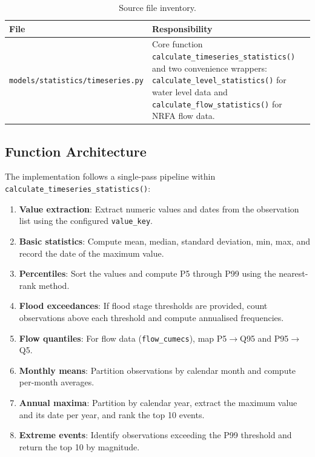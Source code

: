 \documentclass[11pt,a4paper]{article}
\begin{document}
\begin{table}[H]
\centering
\caption{Source file inventory.}
\label{tab:source_files}
\begin{tabular}{lp{10cm}}
\toprule
\textbf{File} & \textbf{Responsibility} \\
\midrule
\texttt{models/statistics/timeseries.py} & Core function \texttt{calculate\_timeseries\_statistics()} and two convenience wrappers: \texttt{calculate\_level\_statistics()} for water level data and \texttt{calculate\_flow\_statistics()} for NRFA flow data. \\
\bottomrule
\end{tabular}
\end{table}

\subsection{Function Architecture}

The implementation follows a single-pass pipeline within \texttt{calculate\_timeseries\_statistics()}:

\begin{enumerate}
    \item \textbf{Value extraction}: Extract numeric values and dates from the observation list using the configured \texttt{value\_key}.
    \item \textbf{Basic statistics}: Compute mean, median, standard deviation, min, max, and record the date of the maximum value.
    \item \textbf{Percentiles}: Sort the values and compute P5 through P99 using the nearest-rank method.
    \item \textbf{Flood exceedances}: If flood stage thresholds are provided, count observations above each threshold and compute annualised frequencies.
    \item \textbf{Flow quantiles}: For flow data (\texttt{flow\_cumecs}), map P5$\to$Q95 and P95$\to$Q5.
    \item \textbf{Monthly means}: Partition observations by calendar month and compute per-month averages.
    \item \textbf{Annual maxima}: Partition by calendar year, extract the maximum value and its date per year, and rank the top 10 events.
    \item \textbf{Extreme events}: Identify observations exceeding the P99 threshold and return the top 10 by magnitude.
\end{enumerate}
\end{document}
